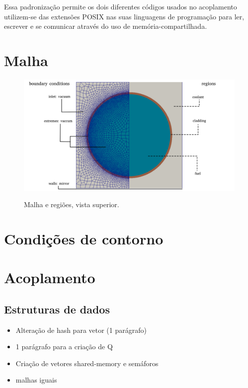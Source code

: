 Essa padronização permite os dois diferentes códigos usados no acoplamento utilizem-se das extensões POSIX nas
suas linguagens de programação para ler, escrever e se comunicar através do uso de memória-compartilhada.






\section{Malha}

\begin{figure}[htb]
  \caption{Malha e regiões, vista superior.}
  \centering\includegraphics[scale=0.5]{figuras/regions_neutronica_malha_e_sem.png}
  \label{regions_malha}
\end{figure}

\section{Condições de contorno}


\section{Acoplamento} %

\subsection{Estruturas de dados}

\begin{itemize}
\item Alteração de hash para vetor (1 parágrafo)
\item 1 parágrafo para a criação de Q
\item Criação de vetores shared-memory e semáforos
  \item malhas iguais
\end{itemize}

